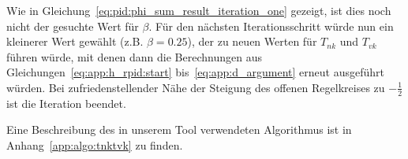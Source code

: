 Wie    in  Gleichung~\ref{eq:pid:phi_sum_result_iteration_one}  gezeigt,   ist
dies  noch  nicht  der  gesuchte  Wert  f\"ur  $\beta$. F\"ur  den  n\"achsten
Iterationsschritt    w\"urde     nun    ein    kleinerer     Wert    gew\"ahlt
(z.B.   $\beta=0.25$),    der   zu    neuen   Werten   f\"ur    $T_{nk}$   und
$T_{vk}$   f\"uhren   w\"urde,   mit   denen   dann   die   Berechnungen   aus
Gleichungen~\ref{eq:app:h_rpid:start}    bis~\ref{eq:app:d_argument}    erneut
ausgef\"uhrt w\"urden. Bei zufriedenstellender N\"ahe der Steigung des offenen
Regelkreises zu $-\frac{1}{2}$ ist die Iteration beendet.

Eine  Beschreibung  des  in  unserem   Tool  verwendeten  Algorithmus  ist  in
Anhang~\ref{app:algo:tnktvk} zu finden.
